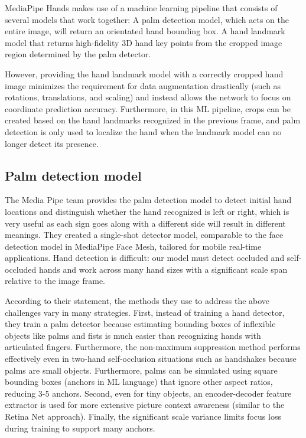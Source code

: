 MediaPipe Hands makes use of a machine learning pipeline that consists of several models that work together: A palm detection model, which acts on the entire image, will return an orientated hand bounding box. A hand landmark model that returns high-fidelity 3D hand key points from the cropped image region determined by the palm detector.

However, providing the hand landmark model with a correctly cropped hand image minimizes the requirement for data augmentation drastically (such as rotations, translations, and scaling) and instead allows the network to focus on coordinate prediction accuracy. Furthermore, in this ML pipeline, crops can be created based on the hand landmarks recognized in the previous frame, and palm detection is only used to localize the hand when the landmark model can no longer detect its presence.
\subsection{ Palm detection model }
The Media Pipe team provides the palm detection model to detect initial hand locations and distinguish whether the hand recognized is left or right, which is very useful as each sign goes along with a different side will result in different meanings. They created a single-shot detector model, comparable to the face detection model in MediaPipe Face Mesh, tailored for mobile real-time applications. Hand detection is difficult: our model must detect occluded and self-occluded hands and work across many hand sizes with a significant scale span relative to the image frame.
        
According to their statement, the methods they use to address the above challenges vary in many strategies. First, instead of training a hand detector, they train a palm detector because estimating bounding boxes of inflexible objects like palms and fists is much easier than recognizing hands with articulated fingers. Furthermore, the non-maximum suppression method performs effectively even in two-hand self-occlusion situations such as handshakes because palms are small objects. Furthermore, palms can be simulated using square bounding boxes (anchors in ML language) that ignore other aspect ratios, reducing 3-5 anchors. Second, even for tiny objects, an encoder-decoder feature extractor is used for more extensive picture context awareness (similar to the Retina Net approach). Finally, the significant scale variance limits focus loss during training to support many anchors.

